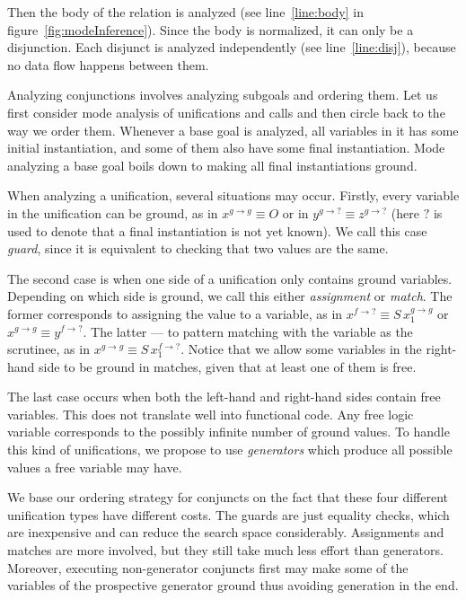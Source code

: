 Then the body of the relation is analyzed (see line~\ref{line:body} in figure~\ref{fig:modeInference}).
Since the body is normalized, it can only be a disjunction.
Each disjunct is analyzed independently (see line~\ref{line:disj}), because no data flow happens between them.

Analyzing conjunctions involves analyzing subgoals and ordering them.
Let us first consider mode analysis of unifications and calls and then circle back to the way we order them.
Whenever a base goal is analyzed, all variables in it has some initial instantiation, and some of them also have some final instantiation.
Mode analyzing a base goal boils down to making all final instantiations ground.

When analyzing a unification, several situations may occur.
Firstly, every variable in the unification can be ground, as in $x^{g \rightarrow g} \equiv O$ or in $y^{g \rightarrow ?} \equiv z^{g \rightarrow ?}$ (here $?$ is used to denote that a final instantiation is not yet known).
We call this case \emph{guard}, since it is equivalent to checking that two values are the same.

The second case is when one side of a unification only contains ground variables.
Depending on which side is ground, we call this either \emph{assignment} or \emph{match}.
The former corresponds to assigning the value to a variable, as in $x^{f \rightarrow ?} \equiv S \, x_1^{g \rightarrow g}$ or $x^{g \rightarrow g} \equiv y^{f \rightarrow ?}$.
The latter --- to pattern matching with the variable as the scrutinee, as in $x^{g \rightarrow g} \equiv S \, x_1^{f \rightarrow ?}$.
Notice that we allow some variables in the right-hand side to be ground in matches, given that at least one of them is free.

The last case occurs when both the left-hand and right-hand sides contain free variables.
This does not translate well into functional code.
Any free logic variable corresponds to the possibly infinite number of ground values.
To handle this kind of unifications, we propose to use \emph{generators} which produce all possible values a free variable may have.

We base our ordering strategy for conjuncts on the fact that these four different unification types have different costs.
The guards are just equality checks, which are inexpensive and can reduce the search space considerably.
Assignments and matches are more involved, but they still take much less effort than generators.
Moreover, executing non-generator conjuncts first may make some of the variables of the prospective generator ground thus avoiding generation in the end.

